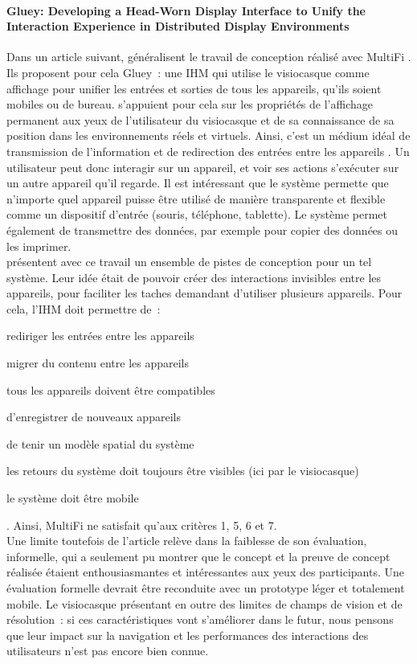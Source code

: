 \paragraph*{\foreignlanguage{english}{Gluey: Developing a Head-Worn Display Interface to Unify the Interaction Experience in Distributed Display Environments}}
Dans un article suivant, \cite{SerranoEnsYangEtAl2015} généralisent le travail de conception réalisé avec MultiFi \citep{GrubertHeinischQuigleyEtAl2015}. Ils proposent pour cela Gluey~: une IHM qui utilise le visiocasque comme affichage pour unifier les entrées et sorties de tous les appareils, qu'ils soient mobiles ou de bureau. \citeauthor{SerranoEnsYangEtAl2015} s'appuient pour cela sur les propriétés de l'affichage permanent aux yeux de l'utilisateur du visiocasque et de sa connaissance de sa position dans les environnements réels et virtuels. Ainsi, c'est un médium idéal de transmission de l'information et de redirection des entrées entre les appareils .
Un utilisateur peut donc interagir sur un appareil, et voir ses actions s'exécuter sur un autre appareil qu'il regarde. Il est intéressant que le système permette que n'importe quel appareil puisse être utilisé de manière transparente et flexible comme un dispositif d'entrée (souris, téléphone, tablette). Le système permet également de transmettre des données, par exemple pour copier des données ou les imprimer.\\
\citeauthor{SerranoEnsYangEtAl2015} présentent avec ce travail un ensemble de pistes de conception pour un tel système. Leur idée était de pouvoir créer des interactions invisibles entre les appareils, pour faciliter les taches demandant d'utiliser plusieurs appareils. Pour cela, l'IHM doit permettre de~: 
\begin{enumerate*}
	\item rediriger les entrées entre les appareils
	\item migrer du contenu entre les appareils
	\item tous les appareils doivent être compatibles
	\item d'enregistrer de nouveaux appareils
	\item de tenir un modèle spatial du système
	\item les retours du système doit toujours être visibles (ici par le visiocasque)
	\item le système doit être mobile
\end{enumerate*}. Ainsi, MultiFi \citep{GrubertHeinischQuigleyEtAl2015} ne satisfait qu'aux critères 1, 5, 6 et 7.\\
Une limite toutefois de l'article relève dans la faiblesse de son évaluation, informelle, qui a seulement pu montrer que le concept et la preuve de concept réalisée étaient enthousiasmantes et intéressantes aux yeux des participants. Une évaluation formelle devrait être reconduite avec un prototype léger et totalement mobile. Le visiocasque présentant en outre des limites de champs de vision et de résolution~: si ces caractéristiques vont s'améliorer dans le futur, nous pensons que leur impact sur la navigation et les performances des interactions des utilisateurs n'est pas encore bien connue.

